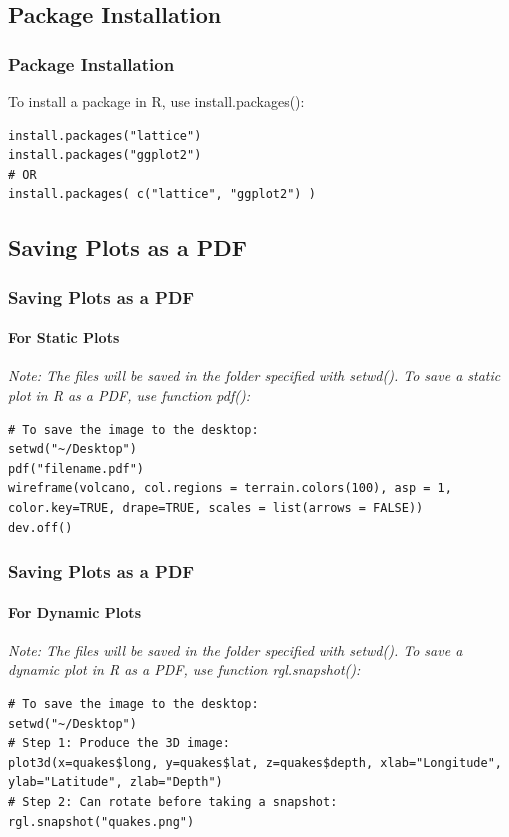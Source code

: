 \subsection{Package Installation}

\begin{frame}[fragile]
  \frametitle{Package Installation}

  To install a package in R, use \ttfamily install.packages()\normalfont:
  \begin{lstlisting}
install.packages("lattice")
install.packages("ggplot2")
# OR
install.packages( c("lattice", "ggplot2") )
  \end{lstlisting}

\end{frame}

\subsection{Saving Plots as a PDF} 
\begin{frame}[fragile]
\frametitle{Saving Plots as a PDF}
  \framesubtitle{For Static Plots}

  \itshape Note: \normalfont The files will be saved in the folder specified with \ttfamily setwd(). \normalfont
  To save a static plot in \ttfamily R \normalfont as a PDF, use function \ttfamily pdf(): \normalfont

  \begin{lstlisting}
# To save the image to the desktop:
setwd("~/Desktop")
pdf("filename.pdf")
wireframe(volcano, col.regions = terrain.colors(100), asp = 1, color.key=TRUE, drape=TRUE, scales = list(arrows = FALSE))
dev.off()
  \end{lstlisting}

\end{frame}

\begin{frame}[fragile]
  \frametitle{Saving Plots as a PDF}
  \framesubtitle{For Dynamic Plots}

  \itshape Note: \normalfont The files will be saved in the folder specified with \ttfamily setwd(). \normalfont
  To save a dynamic plot in \ttfamily R \normalfont as a PDF, use function \ttfamily rgl.snapshot(): \normalfont

  \begin{lstlisting}
# To save the image to the desktop:
setwd("~/Desktop")
# Step 1: Produce the 3D image:
plot3d(x=quakes$long, y=quakes$lat, z=quakes$depth, xlab="Longitude", ylab="Latitude", zlab="Depth")
# Step 2: Can rotate before taking a snapshot:
rgl.snapshot("quakes.png")
  \end{lstlisting}

\end{frame}

